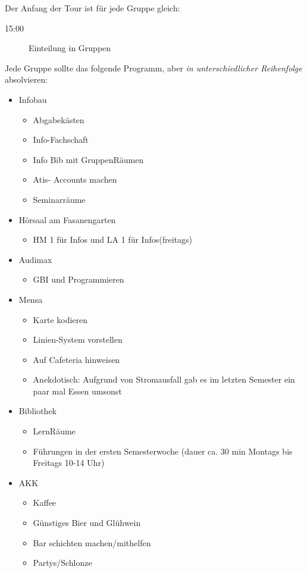 \documentclass[10pt,twocolumn,ngerman]{scrartcl}
\begin{document}
Der Anfang der Tour ist für jede Gruppe gleich:
\begin{description}
\item [{15:00}] Einteilung in Gruppen\setlength{\itemsep}{0pt}
\end{description}
Jede Gruppe sollte das folgende Programm, aber \emph{in unterschiedlicher
Reihenfolge} absolvieren:
\begin{itemize}
\item Infobau
\begin{itemize}
\item Abgabekästen
\item Info-Fachschaft
\item Info Bib mit GruppenRäumen
\item Atis- Accounts machen
\item Seminarräume
\end{itemize}
\item Hörsaal am Fasanengarten
\begin{itemize}
\item HM 1 für Infos und LA 1 für Infos(freitags)
\end{itemize}
\item Audimax
\begin{itemize}
\item GBI und Programmieren
\end{itemize}
\item Mensa
\begin{itemize}
\item Karte kodieren
\item Linien-System vorstellen
\item Auf Cafeteria hinweisen 
\item Anekdotisch: Aufgrund von Stromausfall gab es im letzten Semester
ein paar mal Essen umsonst
\end{itemize}
\item Bibliothek
\begin{itemize}
\item LernRäume
\item Führungen in der ersten Semesterwoche (dauer ca. 30 min Montags bis
Freitags 10-14 Uhr)
\end{itemize}
\item AKK
\begin{itemize}
\item Kaffee 
\item Günstiges Bier und Glühwein 
\item Bar schichten machen/mithelfen 
\item Partys/Schlonze 

\end{itemize}
\end{itemize}
\end{document}

